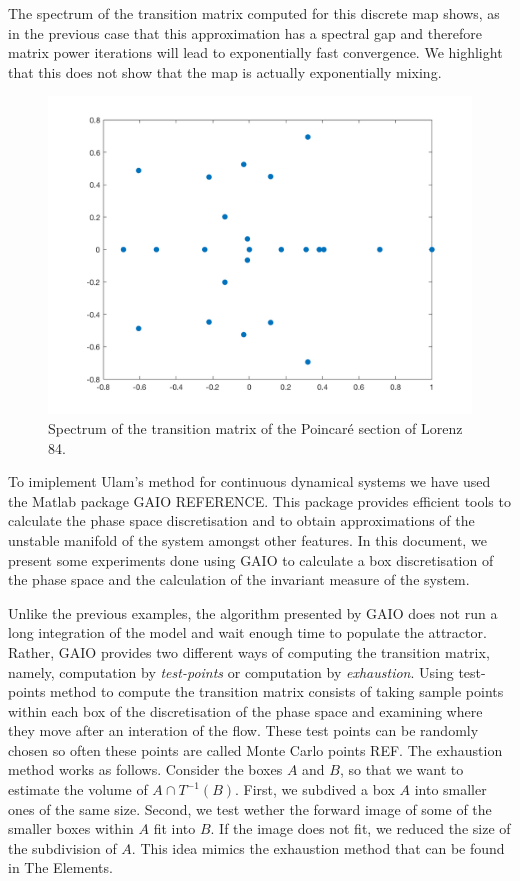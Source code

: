 The spectrum of the transition matrix computed for this discrete map shows, as in the previous case that this approximation has a spectral gap and therefore matrix power iterations will lead to exponentially fast convergence. We highlight that this does not show that the map is actually exponentially mixing.

\begin{figure}[H]
	\centering
	\includegraphics[scale=0.2]{spectruml84.png}
	\caption{Spectrum of the transition matrix of the Poincar\'{e} section of Lorenz 84.}
\end{figure}

To imiplement Ulam's method for continuous dynamical systems we have used the Matlab package GAIO REFERENCE. This package provides efficient tools to calculate the phase space discretisation and to obtain approximations of the unstable manifold of the system amongst other features. In this document, we present some experiments done using GAIO to calculate a box discretisation of the phase space and the calculation of the invariant measure of the system.

 Unlike the previous examples, the algorithm presented by GAIO does not run a long integration of the model and wait enough time to populate the attractor. Rather, GAIO provides two different ways of computing the transition matrix, namely, computation by \emph{test-points} or computation by \emph{exhaustion}. Using test-points method to compute the transition matrix consists of taking sample points within each box of the discretisation of the phase space and examining where they move after an interation of the flow. These test points can be randomly chosen so often these points are called Monte Carlo points REF. The exhaustion method works as follows. Consider the boxes $A$ and $B$, so that we want to estimate the volume of $A\cap T^{-1}(B)$. First, we subdived a box $A$ into smaller ones of the same size. Second, we test wether the forward image of some of the smaller boxes within $A$ fit into $B$. If the image does not fit, we reduced the size of the subdivision of $A$. This idea mimics the exhaustion method that can be found in The Elements.

